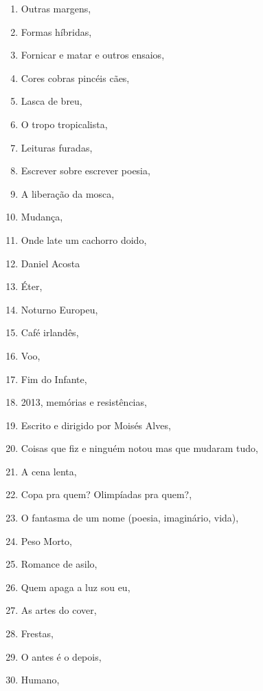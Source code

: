 \begin{multicols}{2}
\begin{enumerate}
\item Outras margens, {}
\item Formas híbridas, {}
\item Fornicar e matar e outros ensaios, {}
\item Cores cobras pincéis cães, {}
\item Lasca de breu, {}
\item O tropo tropicalista, {}
\item Leituras furadas, {}
\item Escrever sobre escrever poesia, {}
\item A liberação da mosca, {}
\item Mudança, {}
\item Onde late um cachorro doido, {}
\item Daniel Acosta
\item Éter, {}
\item Noturno Europeu, {}
\item Café irlandês, {}
\item Voo, {}
\item Fim do Infante, {}
\item 2013, memórias e resistências, {}
\item Escrito e dirigido por Moisés Alves, {}
\item Coisas que fiz e ninguém notou mas que mudaram tudo, {}
\item A cena lenta, {}
\item Copa pra quem? Olimpíadas pra quem?, {}
\item O fantasma de um nome (poesia, imaginário, vida), {}
\item Peso Morto, {}
\item Romance de asilo, {}
\item Quem apaga a luz sou eu, {}
\item As artes do cover, {}
\item Frestas, {}
\item O antes é o depois, {}
\item Humano, {}
\end{enumerate}
\end{multicols}

